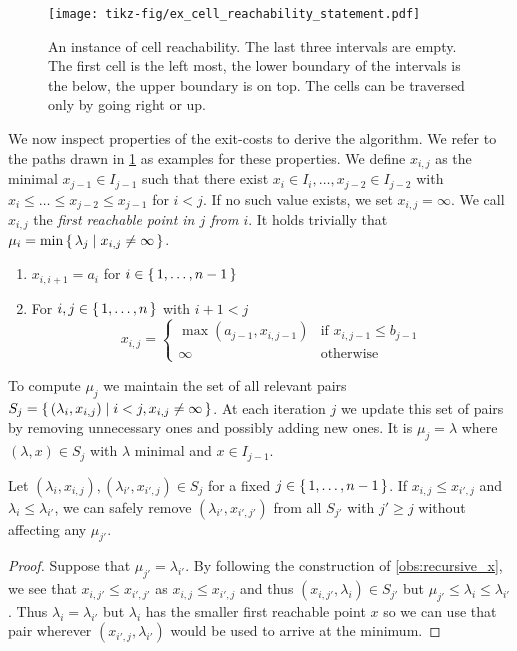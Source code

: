 \begin{figure}[htb]
  \centering
  \texttt{[image: tikz-fig/ex\_cell\_reachability\_statement.pdf]}
  \caption{An instance of cell reachability. The last three intervals are empty. The first cell is the left most, the lower boundary of the intervals is the below, the upper boundary is on top. The cells can be traversed only by going right or up.}
  \label{fig:ex_cell_reachability_statement}
\end{figure}

We now inspect properties of the exit-costs to derive the algorithm. We refer to the paths drawn in \cref{fig:ex_cell_reachability_statement} as examples for these properties. We define \(x_{i, j}\) as the minimal \(x_{j-1} \in I_{j-1}\) such that there exist \(x_i \in I_i, \dots, x_{j-2} \in I_{j-2}\) with \(x_i \leq \dots \leq x_{j-2} \leq x_{j-1}\) for \(i < j\). If no such value exists, we set \(x_{i, j} = \infty\). We call \(x_{i,j}\) the \emph{first reachable point in \(j\) from \(i\)}. It holds trivially that \(\mu_i = \min \set{\lambda_j \mid x_{i, j} \neq \infty}\).

\begin{observation}\label{obs:recursive_x}
  \begin{enumerate}
		\item \(x_{i, i+1} = a_i\) for \(i \in \set{1, \dots, n - 1}\) 
		\item For \(i, j \in \set{1, \dots, n}\) with \(i + 1 < j\)
			\[x_{i, j} = 
			\begin{cases}
				\max(a_{j-1}, x_{i, j - 1}) & \textrm{if } x_{i, j-1} \leq b_{j-1}\\
				\infty &\textrm{otherwise}
			\end{cases}\]
  \end{enumerate}
\end{observation}

To compute \(\mu_j\) we maintain the set of all relevant pairs \(S_j = \set{(\lambda_i, x_{i, j}) \mid i < j, x_{i, j} \neq \infty}\). At each iteration \(j\) we update this set of pairs by removing unnecessary ones and possibly adding new ones. It is \(\mu_j = \lambda\) where \((\lambda, x) \in S_j\) with \(\lambda\) minimal and \(x \in I_{j-1}\).

\begin{lemma}\label{lem:asc-desc}
	Let \((\lambda_i, x_{i, j}), (\lambda_{i'}, x_{i', j}) \in S_j\) for a fixed \(j \in \set{1, \dots, n-1}\). If \(x_{i, j} \leq x_{i', j}\) and \(\lambda_i \leq \lambda_{i'}\), we can safely remove \((\lambda_{i'}, x_{i', j'})\) from all \(S_{j'}\) with \(j' \geq j\) without affecting any \(\mu_{j'}\).
\end{lemma}
\begin{proof}
	Suppose that \(\mu_{j'} = \lambda_{i'}\). By following the construction of \cref{obs:recursive_x}, we see that \(x_{i, j'} \leq x_{i', j'}\) as \(x_{i, j} \leq x_{i', j}\) and thus \((x_{i, j'}, \lambda_i) \in S_{j'}\) but \(\mu_{j'} \leq \lambda_i \leq \lambda_{i'}\). Thus \(\lambda_i = \lambda_{i'}\) but \(\lambda_i\) has the smaller first reachable point \(x\) so we can use that pair wherever \((x_{i', j}, \lambda_{i'})\) would be used to arrive at the minimum.
\end{proof}

